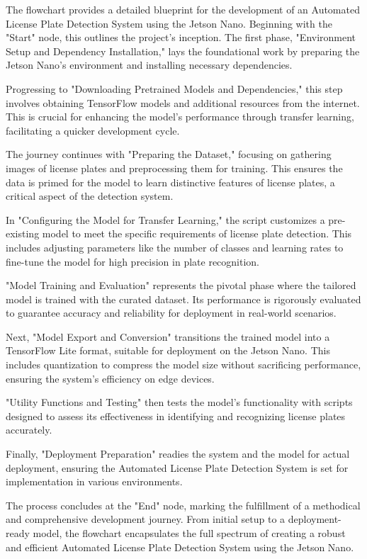 	The flowchart provides a detailed blueprint for the development of an Automated License Plate Detection System using the Jetson Nano. Beginning with the "Start" node, this outlines the project's inception. The first phase, "Environment Setup and Dependency Installation," lays the foundational work by preparing the Jetson Nano's environment and installing necessary dependencies.
	
	Progressing to "Downloading Pretrained Models and Dependencies," this step involves obtaining TensorFlow models and additional resources from the internet. This is crucial for enhancing the model's performance through transfer learning, facilitating a quicker development cycle.
	
	The journey continues with "Preparing the Dataset," focusing on gathering images of license plates and preprocessing them for training. This ensures the data is primed for the model to learn distinctive features of license plates, a critical aspect of the detection system.
	
	In "Configuring the Model for Transfer Learning," the script customizes a pre-existing model to meet the specific requirements of license plate detection. This includes adjusting parameters like the number of classes and learning rates to fine-tune the model for high precision in plate recognition.
	
	"Model Training and Evaluation" represents the pivotal phase where the tailored model is trained with the curated dataset. Its performance is rigorously evaluated to guarantee accuracy and reliability for deployment in real-world scenarios.
	
	Next, "Model Export and Conversion" transitions the trained model into a TensorFlow Lite format, suitable for deployment on the Jetson Nano. This includes quantization to compress the model size without sacrificing performance, ensuring the system's efficiency on edge devices.
	
	"Utility Functions and Testing" then tests the model's functionality with scripts designed to assess its effectiveness in identifying and recognizing license plates accurately.
	
	Finally, "Deployment Preparation" readies the system and the model for actual deployment, ensuring the Automated License Plate Detection System is set for implementation in various environments.
	
	The process concludes at the "End" node, marking the fulfillment of a methodical and comprehensive development journey. From initial setup to a deployment-ready model, the flowchart encapsulates the full spectrum of creating a robust and efficient Automated License Plate Detection System using the Jetson Nano.
	
